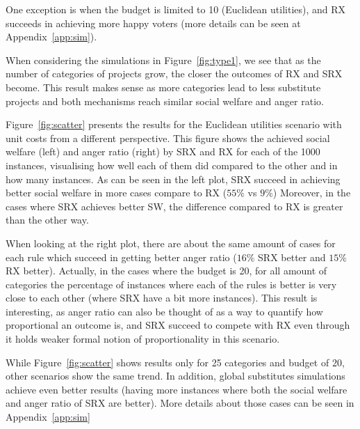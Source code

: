 \documentclass[runningheads]{llncs}
\begin{document}

One exception is when the budget is limited to 10 (Euclidean utilities), and RX succeeds in achieving  more happy voters (more details can be seen at Appendix~\ref{app:sim}).

When considering the   simulations in Figure~\ref{fig:type1}, we   see that as the number of categories of projects grow, the closer  the outcomes of RX and SRX become. This result makes sense as  more categories lead to  less  substitute projects and both mechanisms reach similar social welfare and anger ratio. 

Figure~\ref{fig:scatter} presents the results for the Euclidean utilities scenario with unit costs from a different perspective. This figure shows the achieved social welfare (left) and anger ratio (right) by SRX and RX for each of the 1000 instances, visualising how well each of them did compared to the other and in how many instances. As can be seen in the left plot, SRX succeed in achieving better social welfare in more cases compare to RX ($55\%$ vs $9\%$) Moreover, in the cases where SRX achieves better SW, the difference compared to RX is greater than the other way.

When looking at the right plot, there are about the same amount of cases for each rule which succeed in getting better anger ratio ($16\%$ SRX better and $15\%$ RX better). Actually, in the cases where the budget is 20, for all amount of categories the percentage of instances where each of the rules is better is very close to each other (where SRX have a bit more instances). This result is interesting, as anger ratio can also be thought of as a way to quantify how proportional an outcome is, and SRX succeed to compete with RX even through it holds weaker formal notion of proportionality in this scenario.

While Figure~\ref{fig:scatter} shows results only for 25 categories and budget of 20, other scenarios show the same trend. In addition, global substitutes simulations achieve even better results (having more instances where both the social welfare and anger ratio of SRX are better). More details about those cases can be seen in Appendix~\ref{app:sim}
\end{document}
